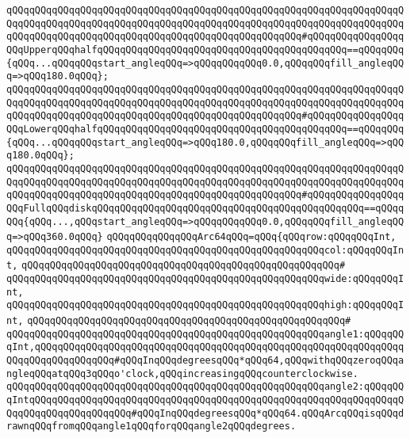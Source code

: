 \verb|qQQqqQQqqQQqqQQqqQQqqQQqqQQqqQQqqQQqqQQqqQQqqQQqqQQqqQQqqQQqqQQqqQQqqQQqqQQqqQQqqQQqqQQqqQQqqQQqqQQqqQQqqQQqqQQqqQQqqQQqqQQqqQQqqQQqqQQqqQQqqQQqqQQqqQQqqQQqqQQqqQQqqQQqqQQqqQQqqQQqqQQqqQQqqQQq#qQQqqQQqqQQqqQQqqQQqUpperqQQqhalfqQQqqQQqqQQqqQQqqQQqqQQqqQQqqQQqqQQqqQQqqQQq==qQQqqQQq{qQQq...qQQqqQQqstart_angleqQQq=>qQQqqQQqqQQq0.0,qQQqqQQqfill_angleqQQq=>qQQq180.0qQQq};|\newline
\verb|qQQqqQQqqQQqqQQqqQQqqQQqqQQqqQQqqQQqqQQqqQQqqQQqqQQqqQQqqQQqqQQqqQQqqQQqqQQqqQQqqQQqqQQqqQQqqQQqqQQqqQQqqQQqqQQqqQQqqQQqqQQqqQQqqQQqqQQqqQQqqQQqqQQqqQQqqQQqqQQqqQQqqQQqqQQqqQQqqQQqqQQqqQQqqQQq#qQQqqQQqqQQqqQQqqQQqLowerqQQqhalfqQQqqQQqqQQqqQQqqQQqqQQqqQQqqQQqqQQqqQQqqQQq==qQQqqQQq{qQQq...qQQqqQQqstart_angleqQQq=>qQQq180.0,qQQqqQQqfill_angleqQQq=>qQQq180.0qQQq};|\newline
\verb|qQQqqQQqqQQqqQQqqQQqqQQqqQQqqQQqqQQqqQQqqQQqqQQqqQQqqQQqqQQqqQQqqQQqqQQqqQQqqQQqqQQqqQQqqQQqqQQqqQQqqQQqqQQqqQQqqQQqqQQqqQQqqQQqqQQqqQQqqQQqqQQqqQQqqQQqqQQqqQQqqQQqqQQqqQQqqQQqqQQqqQQqqQQqqQQq#qQQqqQQqqQQqqQQqqQQqFullqQQqdiskqQQqqQQqqQQqqQQqqQQqqQQqqQQqqQQqqQQqqQQqqQQqqQQq==qQQqqQQq{qQQq...,qQQqstart_angleqQQq=>qQQqqQQqqQQq0.0,qQQqqQQqfill_angleqQQq=>qQQq360.0qQQq}|\newline
\newline
\verb|qQQqqQQqqQQqqQQqArc64qQQq=qQQq{qQQqrow:qQQqqQQqInt,|\newline
\verb|qQQqqQQqqQQqqQQqqQQqqQQqqQQqqQQqqQQqqQQqqQQqqQQqqQQqqQQqcol:qQQqqQQqInt,|\newline
\verb|qQQqqQQqqQQqqQQqqQQqqQQqqQQqqQQqqQQqqQQqqQQqqQQqqQQqqQQq#|\newline
\verb|qQQqqQQqqQQqqQQqqQQqqQQqqQQqqQQqqQQqqQQqqQQqqQQqqQQqqQQqwide:qQQqqQQqInt,|\newline
\verb|qQQqqQQqqQQqqQQqqQQqqQQqqQQqqQQqqQQqqQQqqQQqqQQqqQQqqQQqhigh:qQQqqQQqInt,|\newline
\verb|qQQqqQQqqQQqqQQqqQQqqQQqqQQqqQQqqQQqqQQqqQQqqQQqqQQqqQQq#|\newline
\verb|qQQqqQQqqQQqqQQqqQQqqQQqqQQqqQQqqQQqqQQqqQQqqQQqqQQqqQQqangle1:qQQqqQQqInt,qQQqqQQqqQQqqQQqqQQqqQQqqQQqqQQqqQQqqQQqqQQqqQQqqQQqqQQqqQQqqQQqqQQqqQQqqQQqqQQqqQQq#qQQqInqQQqdegreesqQQq*qQQq64,qQQqwithqQQqzeroqQQqangleqQQqatqQQq3qQQqo'clock,qQQqincreasingqQQqcounterclockwise.|\newline
\verb|qQQqqQQqqQQqqQQqqQQqqQQqqQQqqQQqqQQqqQQqqQQqqQQqqQQqqQQqangle2:qQQqqQQqIntqQQqqQQqqQQqqQQqqQQqqQQqqQQqqQQqqQQqqQQqqQQqqQQqqQQqqQQqqQQqqQQqqQQqqQQqqQQqqQQqqQQqqQQq#qQQqInqQQqdegreesqQQq*qQQq64.qQQqArcqQQqisqQQqdrawnqQQqfromqQQqangle1qQQqforqQQqangle2qQQqdegrees.|\newline
